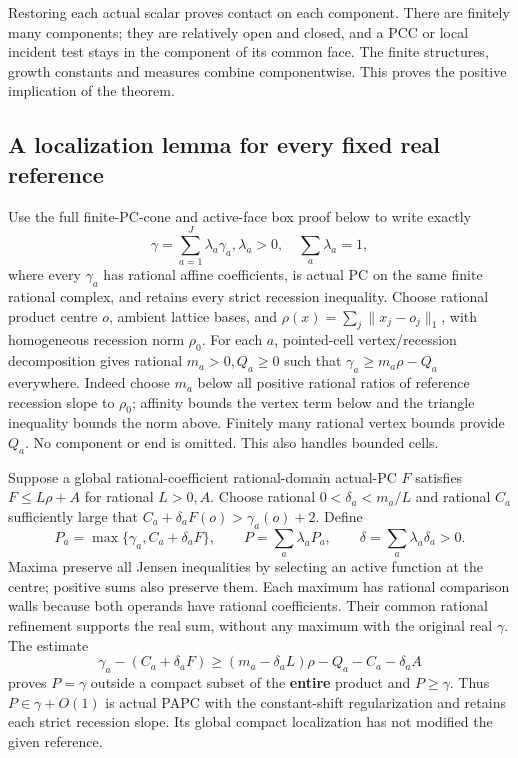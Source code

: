 \documentclass[
  11pt,
]{article}
\begin{document}
Restoring each actual scalar proves contact on each component. There are
finitely many components; they are relatively open and closed, and a PCC
or local incident test stays in the component of its common face. The
finite structures, growth constants and measures combine componentwise.
This proves the positive implication of the theorem.

\subsection{A localization lemma for every fixed real
reference}\label{a-localization-lemma-for-every-fixed-real-reference}

Use the full finite-PC-cone and active-face box proof below to write
exactly \[
          \gamma=\sum_{a=1}^J\lambda_a\gamma_a,
                \lambda_a>0,\quad\sum_a\lambda_a=1,
 \tag{R}
\] where every \(\gamma_a\) has rational affine coefficients, is actual
PC on the same finite rational complex, and retains every strict
recession inequality. Choose rational product centre \(o\), ambient
lattice bases, and \(\rho(x)=\sum_j\|x_j-o_j\|_1\), with homogeneous
recession norm \(\rho_0\). For each \(a\), pointed-cell vertex/recession
decomposition gives rational \(m_a>0,Q_a\geq0\) such that
\(\gamma_a\geq m_a\rho-Q_a\) everywhere. Indeed choose \(m_a\) below all
positive rational ratios of reference recession slope to \(\rho_0\);
affinity bounds the vertex term below and the triangle inequality bounds
the norm above. Finitely many rational vertex bounds provide \(Q_a\). No
component or end is omitted. This also handles bounded cells.

Suppose a global rational-coefficient rational-domain actual-PC \(F\)
satisfies \(F\leq L\rho+A\) for rational \(L>0,A\). Choose rational
\(0<\delta_a<m_a/L\) and rational \(C_a\) sufficiently large that
\(C_a+\delta_a F(o)>\gamma_a(o)+2\). Define \[
 P_a=\max\{\gamma_a,C_a+\delta_a F\},\qquad
 P=\sum_a\lambda_a P_a,\qquad \delta=\sum_a\lambda_a\delta_a>0.
 \tag{L}
\] Maxima preserve all Jensen inequalities by selecting an active
function at the centre; positive sums also preserve them. Each maximum
has rational comparison walls because both operands have rational
coefficients. Their common rational refinement supports the real sum,
without any maximum with the original real \(\gamma\). The estimate \[
 \gamma_a-(C_a+\delta_aF)
 \geq(m_a-\delta_aL)\rho-Q_a-C_a-\delta_aA
\] proves \(P=\gamma\) outside a compact subset of the \textbf{entire}
product and \(P\geq\gamma\). Thus \(P\in\gamma+O(1)\) is actual PAPC
with the constant-shift regularization and retains each strict recession
slope. Its global compact localization has not modified the given
reference.
\end{document}
